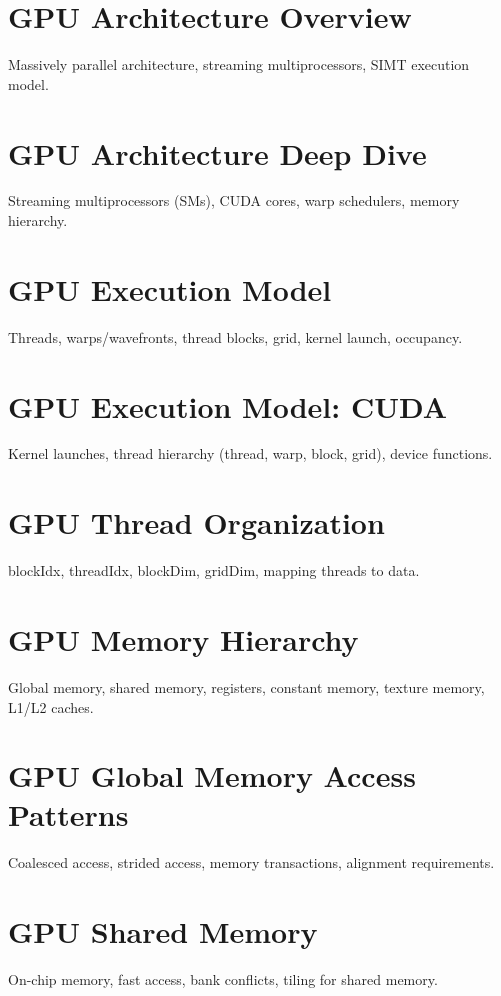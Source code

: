 
\chapter{GPU Architecture Overview}
Massively parallel architecture, streaming multiprocessors, SIMT execution model.

\chapter{GPU Architecture Deep Dive}
Streaming multiprocessors (SMs), CUDA cores, warp schedulers, memory hierarchy.

\chapter{GPU Execution Model}
Threads, warps/wavefronts, thread blocks, grid, kernel launch, occupancy.

\chapter{GPU Execution Model: CUDA}
Kernel launches, thread hierarchy (thread, warp, block, grid), device functions.

\chapter{GPU Thread Organization}
blockIdx, threadIdx, blockDim, gridDim, mapping threads to data.

\chapter{GPU Memory Hierarchy}
Global memory, shared memory, registers, constant memory, texture memory, L1/L2 caches.

\chapter{GPU Global Memory Access Patterns}
Coalesced access, strided access, memory transactions, alignment requirements.

\chapter{GPU Shared Memory}
On-chip memory, fast access, bank conflicts, tiling for shared memory.

